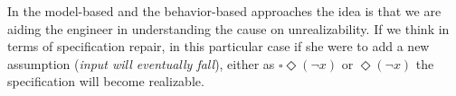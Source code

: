 In the model-based and the behavior-based approaches the
idea is that we are aiding the engineer in understanding the
cause on unrealizability.  If we think in terms of specification repair,
in this particular case if she were to add
a new assumption (\textit{input will eventually fall}), either as
$\square\Diamond(\neg x)$ or $\Diamond(\neg x)$ the specification
will become realizable.
